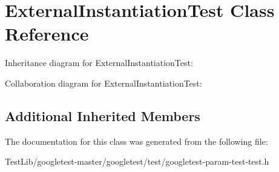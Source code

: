 \hypertarget{classExternalInstantiationTest}{}\section{External\+Instantiation\+Test Class Reference}
\label{classExternalInstantiationTest}


Inheritance diagram for External\+Instantiation\+Test\+:


Collaboration diagram for External\+Instantiation\+Test\+:
\subsection*{Additional Inherited Members}


The documentation for this class was generated from the following file\+:\begin{DoxyCompactItemize}
\item 
Test\+Lib/googletest-\/master/googletest/test/googletest-\/param-\/test-\/test.\+h\end{DoxyCompactItemize}
